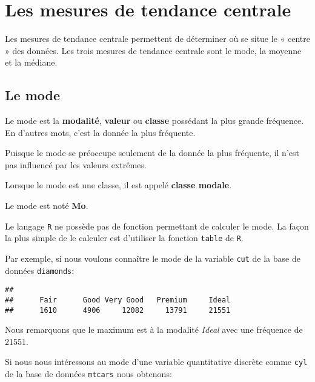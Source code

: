 \documentclass[]{book}
\newenvironment{Shaded}{\begin{snugshade}}{\end{snugshade}}
\newcommand{\KeywordTok}[1]{\textcolor[rgb]{0.13,0.29,0.53}{\textbf{#1}}}
\newcommand{\OperatorTok}[1]{\textcolor[rgb]{0.81,0.36,0.00}{\textbf{#1}}}
\newcommand{\NormalTok}[1]{#1}
\begin{document}
\section{Les mesures de tendance
centrale}\label{les-mesures-de-tendance-centrale}

Les mesures de tendance centrale permettent de déterminer où se situe le
« centre » des données. Les trois mesures de tendance centrale sont le
mode, la moyenne et la médiane.

\subsection{Le mode}\label{le-mode}

Le mode est la \textbf{modalité}, \textbf{valeur} ou \textbf{classe}
possédant la plus grande fréquence. En d'autres mots, c'est la donnée la
plus fréquente.

Puisque le mode se préoccupe seulement de la donnée la plus fréquente,
il n'est pas influencé par les valeurs extrêmes.

Lorsque le mode est une classe, il est appelé \textbf{classe modale}.

Le mode est noté \textbf{Mo}.

Le langage \texttt{R} ne possède pas de fonction permettant de calculer
le mode. La façon la plus simple de le calculer est d'utiliser la
fonction \texttt{table} de \texttt{R}.

Par exemple, si nous voulons connaître le mode de la variable
\texttt{cut} de la base de données \texttt{diamonds}:

\begin{Shaded}
\end{Shaded}

\begin{verbatim}
## 
##      Fair      Good Very Good   Premium     Ideal 
##      1610      4906     12082     13791     21551
\end{verbatim}

Nous remarquons que le maximum est à la modalité \emph{Ideal} avec une
fréquence de 21551.

Si nous nous intéressons au mode d'une variable quantitative discrète
comme \texttt{cyl} de la base de données \texttt{mtcars} nous obtenons:

\begin{Shaded}
\end{Shaded}
\end{document}

